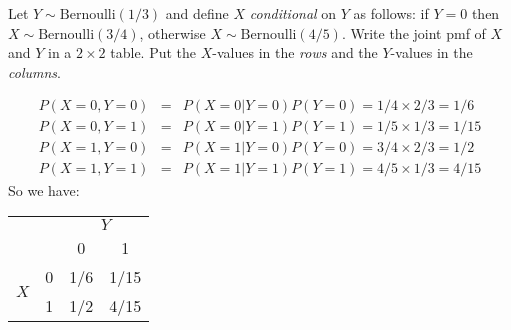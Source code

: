 \documentclass[addpoints,12pt]{exam}
\begin{document}
\begin{questions}
\question[20] Let $Y\sim \mbox{Bernoulli}(1/3)$ and define $X$ \emph{conditional} on $Y$ as follows: if $Y = 0$ then $X \sim \mbox{Bernoulli}(3/4)$, otherwise $X\sim \mbox{Bernoulli}(4/5)$. %
Write the joint pmf of $X$ and $Y$ in a $2\times 2$ table. Put the $X$-values in the \emph{rows} and the $Y$-values in the \emph{columns}. 		
	\begin{solution}[5in]
	\begin{eqnarray*}
		P(X=0,Y=0) &=& P(X=0|Y=0)P(Y=0) = 1/4 \times 2/3 = 1/6\\
		P(X=0,Y=1) &=& P(X=0|Y=1)P(Y=1) = 1/5 \times 1/3 = 1/15\\
		P(X=1,Y=0) &=& P(X=1|Y=0)P(Y=0) = 3/4 \times 2/3 = 1/2\\
		P(X=1,Y=1) &=& P(X=1|Y=1)P(Y=1) = 4/5 \times 1/3 = 4/15
	\end{eqnarray*}
	So we have:
		\begin{center}
		\begin{tabular}{|cc|cc|}
			\hline
			&&\multicolumn{2}{c|}{$Y$}\\
			&&0 & 1\\
			\hline
			\multirow{2}{*}{$X$}
			&0& \multicolumn{1}{|c}{1/6} & 1/15\\
			&1& \multicolumn{1}{|c}{1/2} & 4/15\\
			\hline
		\end{tabular}
		\end{center}
	\end{solution}
	

\end{questions}
\end{document}
